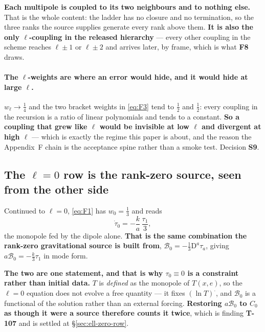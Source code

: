 \textbf{Each multipole is coupled to its two neighbours and to nothing else.}
That is the whole content: the ladder has no closure and no termination, so
the three ranks the source supplies generate every rank above them. \textbf{It
is also the only $\ell$-coupling in the released hierarchy} --- every other
coupling in the scheme reaches $\ell\pm1$ or $\ell\pm2$ and arrives later, by
frame, which is what \textbf{F8} draws.

\paragraph{The $\ell$-weights are where an error would hide, and it would hide
at large $\ell$.} $w_\ell\to\tfrac14$ and the two bracket weights in
\eqref{eq:F3} tend to $\tfrac12$ and $\tfrac12$: every coupling in the
recursion is a ratio of linear polynomials and tends to a constant.
\textbf{So a coupling that grew like $\ell$ would be invisible at low $\ell$
and divergent at high $\ell$} --- which is exactly the regime this paper is
about, and the reason the Appendix~F chain is the acceptance spine rather than
a smoke test. Decision \textbf{S9}.

\subsection{The $\ell=0$ row is the rank-zero source, seen from the other side}

Continued to $\ell=0$, \eqref{eq:F1} has $w_0=\tfrac13$ and reads
\begin{equation}
  \dot\tau_0=-\frac{k}{a}\,\frac{\tau_1}{3} ,
  \label{eq:F1-ell0}
\end{equation}
the monopole fed by the dipole alone. \textbf{That is the same combination the
rank-zero gravitational source is built from}, $\mathcal
B_0=-\tfrac13\mathrm D^a\tau_a$, giving $a\mathcal B_0=-\tfrac k3\tau_1$ in
mode form.

\textbf{The two are one statement, and that is why $\tau_0\equiv0$ is a
constraint rather than initial data.} $T$ is \emph{defined} as the monopole of
$T(x,e)$, so the $\ell=0$ equation does not evolve a free quantity --- it
fixes $(\ln T)^{\textstyle\cdot}$, and $\mathcal B_0$ is a functional of the
solution rather than an external forcing. \textbf{Restoring $a\mathcal B_0$ to
$C_0$ as though it were a source therefore counts it twice}, which is finding
\textbf{T-107} and is settled at \S\ref{sec:ell-zero-row}.

